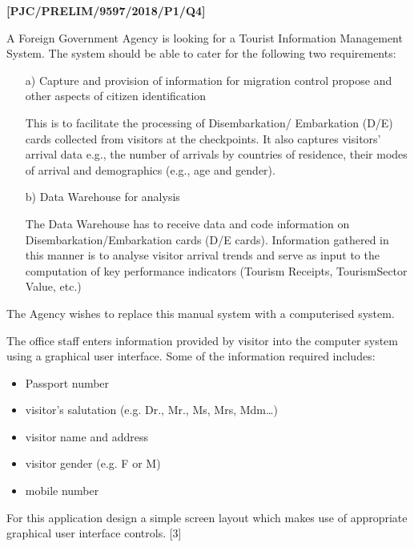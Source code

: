 \item \textbf{{[}PJC/PRELIM/9597/2018/P1/Q4{]} }

\noindent A Foreign Government Agency is looking for a Tourist Information
Management System. The system should be able to cater for the following
two requirements: 
\begin{enumerate}
\item[a)]  Capture and provision of information for migration control propose
and other aspects of citizen identification 

This is to facilitate the processing of Disembarkation/ Embarkation
(D/E) cards collected from visitors at the checkpoints. It also captures
visitors\textquoteright{} arrival data e.g., the number of arrivals
by countries of residence, their modes of arrival and demographics
(e.g., age and gender). 
\item[b)]  Data Warehouse for analysis 

The Data Warehouse has to receive data and code information on Disembarkation/Embarkation
cards (D/E cards). Information gathered in this manner is to analyse
visitor arrival trends and serve as input to the computation of key
performance indicators (Tourism Receipts, TourismSector Value, etc.)
\end{enumerate}
The Agency wishes to replace this manual system with a computerised
system.

The office staff enters information provided by visitor into the computer
system using a graphical user interface. Some of the information required
includes: 
\begin{itemize}
\item Passport number 
\item visitor\textquoteright s salutation (e.g. Dr., Mr., Ms, Mrs, Mdm\dots ) 
\item visitor name and address 
\item visitor gender (e.g. F or M)
\item mobile number 
\end{itemize}
For this application design a simple screen layout which makes use
of appropriate graphical user interface controls. \hfill{}{[}3{]}